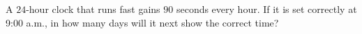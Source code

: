 A $24$-hour clock that runs fast gains $90$ seconds every hour. If it is set correctly at 9:00 a.m., in how many days will it next show the correct time?
